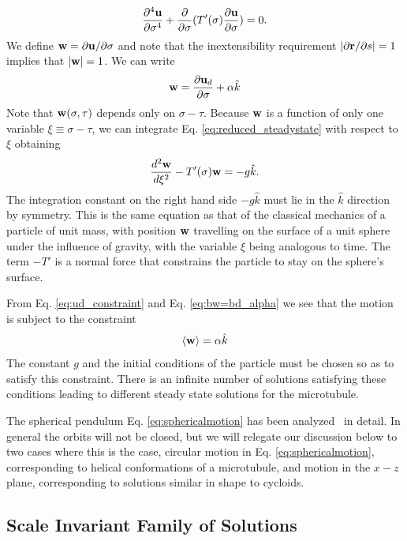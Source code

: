 \documentclass[11pt]{ucthesis}
\def\br{{\bf r}}
\def\bu{{\bf u}}
\def\bw{{\bf w}}
\begin{document}
\begin{equation}
\label{eq:reduced_steadystate}
\frac{\partial^4 \bu}{\partial \sigma^4} + \frac{\partial}{\partial \sigma}(T'(\sigma)\frac{\partial \bu}{\partial \sigma}) = 0.
\end{equation}
We define $\bw = \partial \bu/\partial \sigma$  and
note that the inextensibility requirement $|\partial \br/\partial s| = 1$ implies that $|\bw| = 1$. We can write 
\begin{equation}
\label{eq:bw=bd_alpha}
\bw  = \frac{\partial \bu_d}{\partial \sigma} + \alpha {\hat k}
\end{equation}
Note that $\bw(\sigma,\tau)$ depends only on $\sigma -\tau$. Because $\bw$ is a function
of only one variable $\xi \equiv \sigma -\tau$, 
we can 
integrate Eq. \ref{eq:reduced_steadystate} with respect to $\xi$ obtaining
\begin{equation}
\label{eq:sphericalmotion}
\frac{d^2 \bw}{d \xi^2} - T'(\sigma)\bw = -g {\hat k}.
\end{equation}
The integration constant on the right hand side $-g {\hat k}$ must lie in the $\hat k$ direction by symmetry.
This is the same equation as that of the classical mechanics of a particle of unit mass, with position $\bw$ travelling on the surface of a 
unit sphere under the influence of gravity, with the variable $\xi$ being analogous to time. The term $-T'$ is a normal
force that constrains the particle to stay on the sphere's surface.

From Eq. \ref{eq:ud_constraint} and Eq. \ref{eq:bw=bd_alpha} we see that the motion is subject to the
constraint
\begin{equation}
\label{eq:alpha_constraint}
\langle \bw \rangle = \alpha {\hat k}
\end{equation}
The constant $g$ and the initial conditions of the particle must be chosen so as to satisfy this constraint.
There is an infinite number of solutions satisfying these conditions leading to different 
steady state solutions for the microtubule.

The spherical pendulum Eq. \ref{eq:sphericalmotion} has been analyzed~\cite{CushmanBates} in detail. In general
the orbits will not be closed, but we will relegate
our discussion below to two cases where this is the case, circular motion in Eq. \ref{eq:sphericalmotion}, corresponding to helical
conformations of a microtubule, and motion in the $x-z$ plane, corresponding to solutions similar in shape to cycloids.

\subsection{Scale Invariant Family of Solutions}
\label{subsec:ScaleInvariance}
\end{document}
